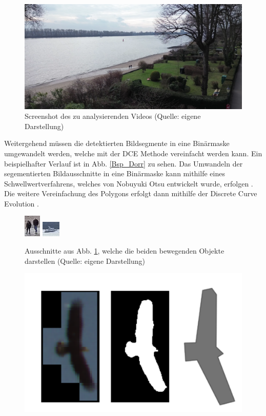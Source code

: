 \documentclass[a4paper,11pt,pdftex, parskip]{scrreprt}
\begin{document}
{\begin{figure}[ht]
    \centering
    \includegraphics[scale=0.2, keepaspectratio]{images/screenshot_video_moratz.png}
    \caption[Screenshot des zu analysierenden Videos]{Screenshot des zu analysierenden Videos (Quelle: eigene Darstellung)}
    \label{Scr_ges_Vid}
\end{figure}
Weitergehend müssen die detektierten Bildsegmente in eine Binärmaske umgewandelt werden, welche mit der DCE Methode vereinfacht werden kann. Ein beispielhafter Verlauf ist in Abb. \ref{Bsp_Dorr} zu sehen.\newline
Das Umwandeln der segementierten Bildausschnitte in eine Binärmaske kann mithilfe eines Schwellwertverfahrens, welches von Nobuyuki Otsu entwickelt wurde, erfolgen \citep{Otsu1979}. Die weitere Vereinfachung des Polygons erfolgt dann mithilfe der Discrete Curve Evolution \citep{Barkowsky2000}.
\begin{figure}[ht]
    \centering
    \includegraphics[scale = 4, keepaspectratio] {images/detail_screenshot_people.png}
    \includegraphics[scale = 4, keepaspectratio]{images/detail_screenshot_boat.png}
    \caption[Ausschnitte aus Abb. \ref{Scr_ges_Vid}, welche die beiden bewegenden Objekte darstellen ]{Ausschnitte aus Abb. \ref{Scr_ges_Vid}, welche die beiden bewegenden Objekte darstellen (Quelle: eigene Darstellung)}
    \label{Scr_detail_Obj}
\end{figure}
\begin{figure}[ht]
    \centering
    \includegraphics*[scale = 0.5, keepaspectratio]{images/Example_bird.png}

\end{figure}}
\end{document}
